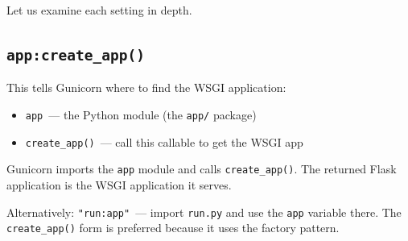 \begin{codebox}[short]

\begin{Shaded}
\begin{Highlighting}[]
\NormalTok{ [}\NormalTok{, }\OperatorTok{\textbackslash{}}
     \NormalTok{, }\OperatorTok{\textbackslash{}}
     \NormalTok{, }\NormalTok{, }\OperatorTok{\textbackslash{}}
     \NormalTok{, }\NormalTok{, }\OperatorTok{\textbackslash{}}
     \NormalTok{, }\NormalTok{, }\OperatorTok{\textbackslash{}}
     \NormalTok{, }\NormalTok{, }\OperatorTok{\textbackslash{}}
     \NormalTok{, }\NormalTok{, }\OperatorTok{\textbackslash{}}
     \NormalTok{, }\NormalTok{]}
\end{Highlighting}
\end{Shaded}

\end{codebox}

\noindent{}Let us examine each setting in depth.

\subsection*{\texorpdfstring{\texttt{app:create\_app()}}{app:create\_app()}}\label{24-process-startup:appcreate-app}

This tells Gunicorn where to find the WSGI application:

\begin{itemize}
\tightlist
\item
  \texttt{app}~--- the Python module (the \texttt{app/} package)
\item
  \texttt{create\_app()}~--- call this callable to get the WSGI app
\end{itemize}

\noindent{}Gunicorn imports the \texttt{app} module and calls \texttt{create\_app()}. The returned Flask application is the WSGI application it serves.

Alternatively: \texttt{"run:app"}~--- import \texttt{run.py} and use the \texttt{app} variable there. The \texttt{create\_app()} form is preferred because it uses the factory pattern.

